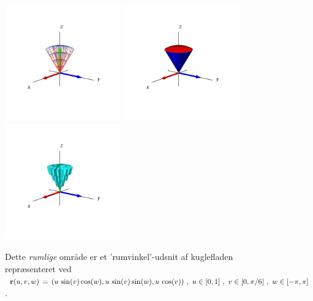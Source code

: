 \begin{figure}[h]
\centerline{\includegraphics[height=50mm]{FIGS/plotSphereProp2} \includegraphics[height=50mm]{FIGS/plotSphereProp1}\includegraphics[height=50mm]{FIGS/plotSphereProp3}}
\begin{center}
\caption{\small{Dette {\em rumlige} område er et 'rumvinkel'-udsnit af kuglefladen repræsenteret ved
${\bf r}(u, v, w) \, = \, (u\,\sin(v)\cos(w), u\,\sin(v)\sin(w),
u\,\cos(v) ) \,\,, \,\, u \in [0, 1 ]\,\, , \, \,
v \in [0, \pi/6]\,\, , \, \, w \in [-\pi, \pi]$.}} \label{figKugleProp}
\end{center}
\end{figure}



